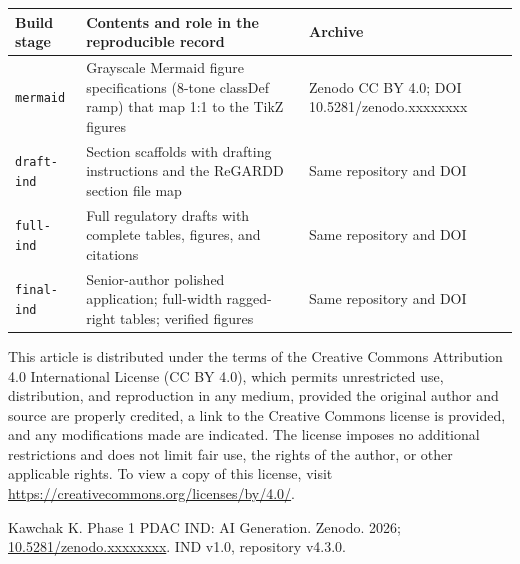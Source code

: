\begin{table}[htbp]
\centering
\begin{tabularx}{\textwidth}{>{\raggedright\arraybackslash}p{2.8cm} Y >{\raggedright\arraybackslash}p{3.0cm}}
\toprule
\textbf{Build stage} & \textbf{Contents and role in the reproducible record} & \textbf{Archive} \\
\midrule
\texttt{mermaid} & Grayscale Mermaid figure specifications (8-tone classDef ramp) that map 1:1 to the TikZ figures & Zenodo CC BY 4.0; DOI 10.5281/zenodo.xxxxxxxx \\
\texttt{draft-ind} & Section scaffolds with drafting instructions and the ReGARDD section file map & Same repository and DOI \\
\texttt{full-ind} & Full regulatory drafts with complete tables, figures, and citations & Same repository and DOI \\
\texttt{final-ind} & Senior-author polished application; full-width ragged-right tables; verified figures & Same repository and DOI \\
\bottomrule
\end{tabularx}
\end{table}

This article is distributed under the terms of the Creative Commons Attribution 4.0
International License (CC BY 4.0), which permits unrestricted use, distribution, and
reproduction in any medium, provided the original author and source are properly
credited, a link to the Creative Commons license is provided, and any modifications
made are indicated. The license imposes no additional restrictions and does not
limit fair use, the rights of the author, or other applicable rights. To view a
copy of this license, visit
\url{https://creativecommons.org/licenses/by/4.0/}.

Kawchak K. Phase 1 PDAC IND: AI Generation. Zenodo. 2026;
\href{https://doi.org/10.5281/zenodo.xxxxxxxx}{10.5281/zenodo.xxxxxxxx}. IND v1.0,
repository v4.3.0.

\clearpage

\begingroup\raggedright\nocite{*}\endgroup
